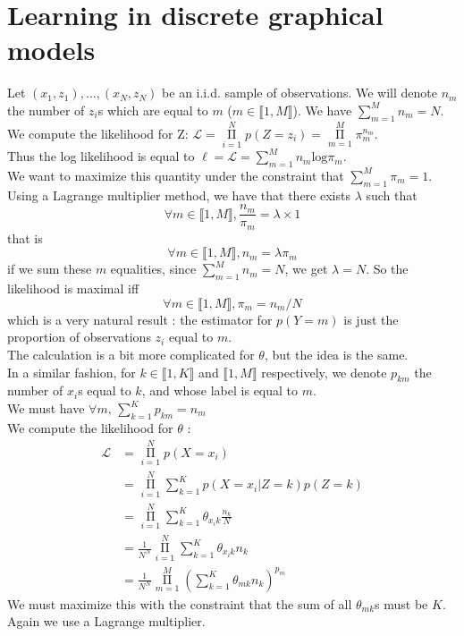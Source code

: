 \documentclass[11pt,a4paper]{article}
\begin{document}
\section{Learning in discrete graphical models}

Let $(x_1, z_1), \ldots, (x_N, z_N)$ be an i.i.d. sample of observations. We will denote $n_m$ the number of $z_i$s which are equal to $m$ ($m \in \llbracket 1, M \rrbracket$). We have $\sum\limits_{m=1}^{M} n_m = N$.
\\We compute the likelihood for Z: $\mathcal{L} = \mathop{\Pi}\limits_{i=1}^N p(Z = z_i) = \mathop{\Pi}\limits_{m=1}^M \pi_m^{n_m}$.
\\Thus the log likelihood is equal to $\ell = \mathcal{L} = \sum\limits_{m=1}^M n_m \mathrm{log} \pi_m$.
\\We want to maximize this quantity under the constraint that $\sum\limits_{m=1}^{M} \pi_m = 1$. Using a Lagrange multiplier method, we have that there exists $\lambda$ such that $$\forall m \in \llbracket 1, M \rrbracket, \frac{n_m}{\pi_m} = \lambda \times 1$$
that is $$\forall m \in \llbracket 1, M \rrbracket, n_m = \lambda \pi_m$$
if we sum these $m$ equalities, since $\sum\limits_{m=1}^{M} n_m = N$, we get $\lambda = N$.
So the likelihood is maximal iff $$\forall m \in \llbracket 1, M \rrbracket,  \pi_m = n_m/N$$
which is a very natural result : the estimator for $p(Y=m)$ is just the proportion of observations $z_i$ equal to $m$.
\\[5mm]The calculation is a bit more complicated for $\theta$, but the idea is the same.
\\In a similar fashion, for $k \in \llbracket 1, K \rrbracket$ and $\llbracket 1, M \rrbracket$ respectively, we denote $p_{km}$ the number of $x_i$s equal to $k$, and whose label is equal to $m$. 
\\We must have $\forall m, \,  \sum\limits_{k=1}^{K}  p_{km} = n_m$
\\We compute the likelihood for $\theta$ : 
$$\begin{aligned} \mathcal{L} &= \mathop{\Pi}\limits_{i=1}^N p(X = x_i) \\
 &= \mathop{\Pi}\limits_{i=1}^N \sum\limits_{k=1}^K p(X=x_i | Z= k) p(Z=k)\\
 & = \mathop{\Pi}\limits_{i=1}^N  \sum\limits_{k=1}^K \theta_{x_i k} \frac{n_k}{N} \\
 & = \frac{1}{N^N} \mathop{\Pi}\limits_{i=1}^N  \sum\limits_{k=1}^K \theta_{x_i k} n_k \\
  & = \frac{1}{N^N} \mathop{\Pi}\limits_{m=1}^M ( \sum\limits_{k=1}^K \theta_{m k} n_k )^{p_m}
 \end{aligned}$$
We must maximize this with the constraint that the sum of all $\theta_{m k}$s must be $K$.
\\Again we use a Lagrange multiplier.
\end{document}
